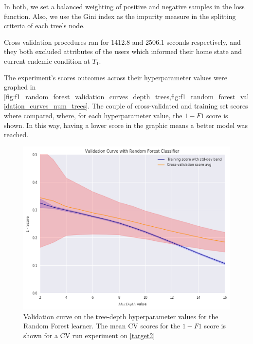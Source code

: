 In both, we set a balanced weighting of positive and negative samples in the loss function. 
Also, we use the Gini index as the impurity measure in the splitting criteria of each tree's node.

Cross validation procedures ran for 1412.8 and 2506.1 seconds respectively, and they both excluded attributes of the users which informed their home state and current endemic condition at $T_1$.

The experiment's scores outcomes across their hyperparameter values were graphed in \cref{fig:f1_random_forest_validation_curves_depth_trees,fig:f1_random_forest_validation_curves_num_trees}.
The couple of cross-validated and training set scores where compared, where, for each hyperparameter value, the $1-F1$ score is shown.
In this way, having a lower score in the graphic means a better model was reached.


\begin{figure}[h!]
	\begin{center}
	 \includegraphics[width=1\linewidth]{figures/random-forest/validation_curve_forest_depth_series_f1}
		\caption{ Validation curve on the tree-depth hyperparameter values for the Random Forest  learner. 
			The mean CV scores for the $1 - F1$ score is shown for a CV run experiment on \cref{target2}}
		\label{fig:f1_random_forest_validation_curves_depth_trees}
		
	\end{center}
\end{figure}

